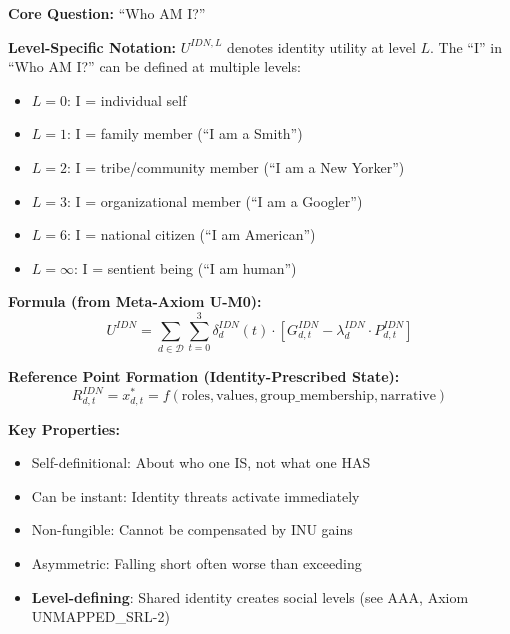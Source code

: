 \begin{tcolorbox}[colback=orange!5!white, colframe=orange!75!black, 
    title=Identity Utility (IDN)]

\textbf{Core Question:} ``Who AM I?''

\textbf{Level-Specific Notation:} $U^{IDN,L}$ denotes identity utility at level $L$.
The ``I'' in ``Who AM I?'' can be defined at multiple levels:
\begin{itemize}[nosep]
\item $L = 0$: I = individual self
\item $L = 1$: I = family member (``I am a Smith'')
\item $L = 2$: I = tribe/community member (``I am a New Yorker'')
\item $L = 3$: I = organizational member (``I am a Googler'')
\item $L = 6$: I = national citizen (``I am American'')
\item $L = \infty$: I = sentient being (``I am human'')
\end{itemize}

\textbf{Formula (from Meta-Axiom U-M0):}
\begin{equation}
U^{IDN} = \sum_{d \in \mathcal{D}} \sum_{t=0}^{3} \delta^{IDN}_{d}(t) \cdot 
\left[ G^{IDN}_{d,t} - \lambda^{IDN}_{d} \cdot P^{IDN}_{d,t} \right]
\end{equation}

\textbf{Reference Point Formation (Identity-Prescribed State):}
\begin{equation}
R^{IDN}_{d,t} = x^{*}_{d,t} = f(\text{roles}, \text{values}, \text{group\_membership}, \text{narrative})
\end{equation}

\textbf{Key Properties:}
\begin{itemize}
\item Self-definitional: About who one IS, not what one HAS
\item Can be instant: Identity threats activate immediately
\item Non-fungible: Cannot be compensated by INU gains
\item Asymmetric: Falling short often worse than exceeding
\item \textbf{Level-defining}: Shared identity creates social levels (see AAA, Axiom UNMAPPED_SRL-2)
\end{itemize}

\end{tcolorbox}

